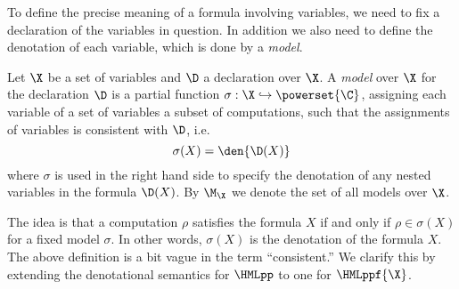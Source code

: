 To define the precise meaning of a formula involving variables, we need to
fix a declaration of the variables in question. In addition we also need
to define the denotation of each variable, which is done by a {\em model}.
\begin{definition}
    \label{dfn:model}
    Let $\X$ be a set of variables and $\D$ a declaration over $\X$. 
    A {\em model} over $\X$ for the declaration $\D$
    is a partial function $\sigma : \X \hookrightarrow \powerset{\C}$,
    assigning each variable of a set of variables a subset of computations,
    such that the assignments of variables is consistent with $\D$, i.e.
    \[
    \sigma(X) = \den{\D(X)}
    \]
    where $\sigma$ is used in the right hand side to specify the denotation
    of any nested variables in the formula $\D(X)$.
    By $\M_\X$ we denote the set of all models over $\X$.
\end{definition}
%
The idea is that a computation $\rho$ satisfies the formula $X$ if and only
if $\rho \in \sigma(X)$ for a fixed model $\sigma$. In other words, $\sigma(X)$
is the denotation of the formula $X$. The above definition is a bit vague
in the term ``consistent.'' We clarify this by 
extending the denotational semantics for $\HMLpp$
to one for $\HMLppf{\X}$.
